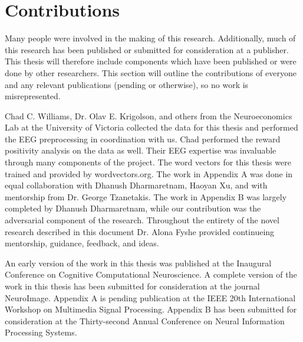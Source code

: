 \section{Contributions}

Many people were involved in the making of this research. Additionally, much of 
this research has been published or submitted for consideration at a publisher.  
This thesis will therefore include components which have been published or were 
done by other researchers. This section will outline the contributions of 
everyone and any relevant publications (pending or otherwise), so no work is 
misrepresented.

Chad C. Williams, Dr. Olav E. Krigolson, and others from the Neuroeconomics Lab 
at the University of Victoria collected the data for this thesis and performed 
the EEG preprocessing in coordination with us. Chad performed the reward 
positivity analysis on the data as well. Their EEG expertise was invaluable 
through many components of the project. The word vectors for this thesis were 
trained and provided by wordvectors.org. The work in Appendix A was done in 
equal collaboration with Dhanush Dharmaretnam, Haoyan Xu, and with mentorship 
from Dr. George Tzanetakis.  The work in Appendix B was largely completed by 
Dhanush Dharmaretnam, while our contribution was the adversarial component of 
the research. Throughout the entirety of the novel research described in this 
document Dr. Alona Fyshe provided continueing mentorship, guidance, feedback, 
and ideas.

An early version of the work in this thesis was published at the Inaugural 
Conference on Cognitive Computational Neuroscience. A complete version of the 
work in this thesis has been submitted for consideration at the journal 
NeuroImage. Appendix A is pending publication at the IEEE 20th International 
Workshop on Multimedia Signal Processing. Appendix B has been submitted for 
consideration at the Thirty-second Annual Conference on Neural Information 
Processing Systems.
